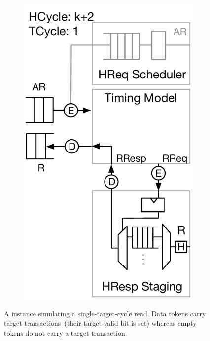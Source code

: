 \begin{figure}[t]
\begin{subfigure}[t]{0.23\textwidth}
        \includegraphics[width=\columnwidth]{figures/model-operation-4.pdf}
        \caption{}
        \label{fig:model-operation-4}
    \end{subfigure}
	\centering
    \caption{A \PNAME instance simulating a single-target-cycle read. Data
    tokens carry target transactions~(their target-valid bit is set) whereas
    empty tokens do not carry a target transaction.}
    \label{fig:model-operation}
\end{figure}

